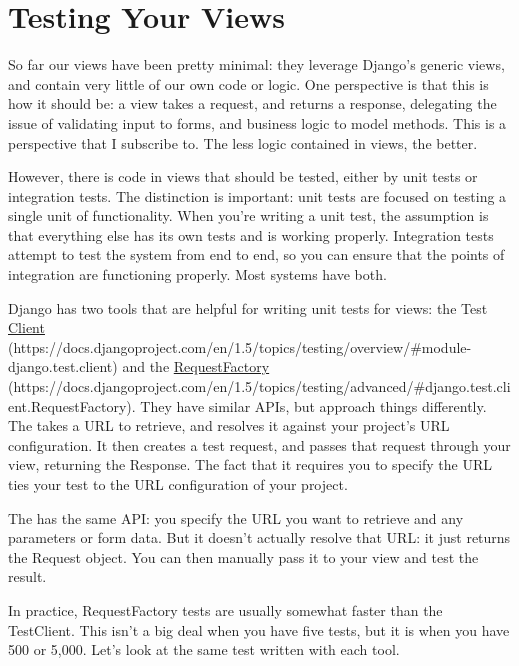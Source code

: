 \documentclass[letterpaper,10pt,english]{sphinxmanual}
\begin{document}
\section{Testing Your Views}
\label{tutorial/views:testing-your-views}
So far our views have been pretty minimal: they leverage Django's
generic views, and contain very little of our own code or logic. One
perspective is that this is how it should be: a view takes a request,
and returns a response, delegating the issue of validating input to
forms, and business logic to model methods. This is a perspective that
I subscribe to. The less logic contained in views, the better.

However, there is code in views that should be tested, either by unit
tests or integration tests. The distinction is important: unit tests
are focused on testing a single unit of functionality. When you're
writing a unit test, the assumption is that everything else has its
own tests and is working properly. Integration tests attempt to test
the system from end to end, so you can ensure that the points of
integration are functioning properly. Most systems have both.

Django has two tools that are helpful for writing unit tests for
views: the Test \href{https://docs.djangoproject.com/en/1.5/topics/testing/overview/\#module-django.test.client}{Client} (https://docs.djangoproject.com/en/1.5/topics/testing/overview/\#module-django.test.client) and the \href{https://docs.djangoproject.com/en/1.5/topics/testing/advanced/\#django.test.client.RequestFactory}{RequestFactory} (https://docs.djangoproject.com/en/1.5/topics/testing/advanced/\#django.test.client.RequestFactory). They have similar
APIs, but approach things differently. The  takes a URL
to retrieve, and resolves it against your project's URL configuration.
It then creates a test request, and passes that request through your
view, returning the Response. The fact that it requires you to specify
the URL ties your test to the URL configuration of your project.

The  has the same API: you specify the URL you want
to retrieve and any parameters or form data. But it doesn't actually
resolve that URL: it just returns the Request object. You can then
manually pass it to your view and test the result.

In practice, RequestFactory tests are usually somewhat faster than the
TestClient. This isn't a big deal when you have five tests, but it is
when you have 500 or 5,000. Let's look at the same test written with
each tool.
\end{document}
